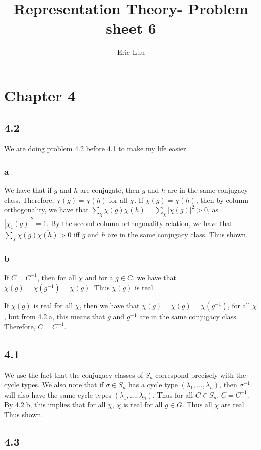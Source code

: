 \documentclass[]{article}
\title{Representation Theory- Problem sheet 6}
\author{Eric Luu}
\begin{document}
\maketitle

\section*{Chapter 4}
\subsection*{4.2}
We are doing problem 4.2 before 4.1 to make my life easier.

\subsubsection*{a}
We have that if $g$ and $h$ are conjugate, then $g$ and $h$ are in the same conjugacy class. Therefore, $\chi(g) = \chi(h)$ for all $\chi$. If $\chi(g) = \chi(h)$, then by column orthogonality, we have that $\sum_\chi \chi(g) \overline{\chi(h)} = \sum_\chi |\chi(g)|^2 > 0$, as $|\chi_1(g)|^2 = 1$. By the second column orthogonality relation, we have that $\sum_\chi \chi(g) \overline{\chi(h)} > 0$ iff $g$ and $h$ are in the same conjugacy class. Thus shown.
\subsubsection*{b}
If $C = C^{-1}$, then for all $\chi$ and for a $g \in C$, we have that $\chi(g) = \chi(g^{-1}) = \overline{\chi(g)}$. Thus $\chi(g)$ is real. 

If $\chi(g)$ is real for all $\chi$, then we have that $\chi(g) = \overline{\chi(g)} = \chi(g^{-1})$, for all $\chi$, but from 4.2.a, this means that $g$ and $g^{-1}$ are in the same conjugacy class. Therefore, $C = C^{-1}$. 

\subsection*{4.1}
We use the fact that the conjugacy classes of $S_n$ correspond precisely with the cycle types. We also note that if $\sigma \in S_n$ has a cycle type $(\lambda_1, ..., \lambda_n)$, then $\sigma^{-1}$ will also have the same cycle types $(\lambda_1, ..., \lambda_n)$. Thus for all $C \in S_n$, $C = C^{-1}$. By 4.2.b, this implies that for all $\chi$, $\chi$ is real for all $g \in G$. Thus all $\chi$ are real. Thus shown. 

\subsection*{4.3}
\end{document}
